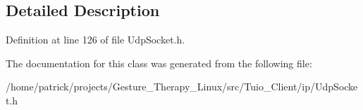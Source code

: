 \subsection{Detailed Description}


Definition at line 126 of file Udp\+Socket.\+h.



The documentation for this class was generated from the following file\+:\begin{DoxyCompactItemize}
\item 
/home/patrick/projects/\+Gesture\+\_\+\+Therapy\+\_\+\+Linux/src/\+Tuio\+\_\+\+Client/ip/Udp\+Socket.\+h\end{DoxyCompactItemize}
